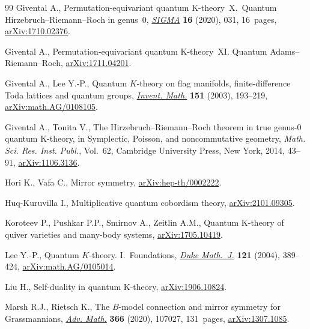 \documentclass[pdftex]{sigma}
\numberwithin{equation}{section}
\begin{document}
\begin{thebibliography}{99}
Givental A., Permutation-equivariant quantum {K}-theory~{X}.~{Q}uantum
 {H}irzebruch--{R}iemann--{R}och in genus~0, \href{https://doi.org/10.3842/SIGMA.2020.031}{\textit{SIGMA}} \textbf{16}
 (2020), 031, 16~pages, \href{https://arxiv.org/abs/1710.02376}{arXiv:1710.02376}.

Givental A., Permutation-equivariant quantum {K}-theory~{XI}. Quantum
 {A}dams--{R}iemann--{R}och, \href{https://arxiv.org/abs/1711.04201}{arXiv:1711.04201}.


Givental A., Lee Y.-P., Quantum {$K$}-theory on flag manifolds,
 finite-difference {T}oda lattices and quantum groups, \href{https://doi.org/10.1007/s00222-002-0250-y}{\textit{Invent. Math.}}
 \textbf{151} (2003), 193--219, \href{https://arxiv.org/abs/math.AG/0108105}{arXiv:math.AG/0108105}.

Givental A., Tonita V., The {H}irzebruch--{R}iemann--{R}och theorem in true
 genus-0 quantum {K}-theory, in Symplectic, {P}oisson, and noncommutative
 geometry, \textit{Math. Sci. Res. Inst. Publ.}, Vol.~62, Cambridge University
 Press, New York, 2014, 43--91, \href{https://arxiv.org/abs/1106.3136}{arXiv:1106.3136}.

Hori K., Vafa C., Mirror symmetry, \href{https://arxiv.org/abs/hep-th/0002222}{arXiv:hep-th/0002222}.

Huq-Kuruvilla I., Multiplicative quantum cobordism theory, \href{https://arxiv.org/abs/2101.09305}{arXiv:2101.09305}.

Koroteev P., Pushkar P.P., Smirnov A., Zeitlin A.M., Quantum {K}-theory of
 quiver varieties and many-body systems, \href{https://arxiv.org/abs/1705.10419}{arXiv:1705.10419}.

Lee Y.-P., Quantum {$K$}-theory. {I}.~{F}oundations, \href{https://doi.org/10.1215/S0012-7094-04-12131-1}{\textit{Duke Math.~J.}}
 \textbf{121} (2004), 389--424, \href{https://arxiv.org/abs/math.AG/0105014}{arXiv:math.AG/0105014}.

Liu H., Self-duality in quantum {K}-theory, \href{https://arxiv.org/abs/1906.10824}{arXiv:1906.10824}.

Marsh R.J., Rietsch K., The {$B$}-model connection and mirror symmetry for
 {G}rassmannians, \href{https://doi.org/10.1016/j.aim.2020.107027}{\textit{Adv. Math.}} \textbf{366} (2020), 107027, 131~pages,
 \href{https://arxiv.org/abs/1307.1085}{arXiv:1307.1085}.


\end{thebibliography}
\end{document}
